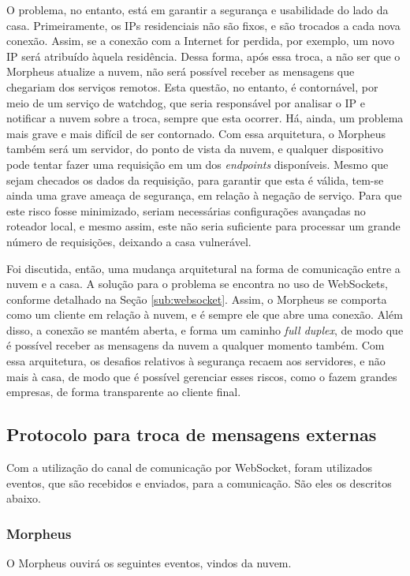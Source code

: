 O problema, no entanto, está em garantir a segurança e usabilidade do lado da casa. Primeiramente, os IPs residenciais não são fixos, e são trocados a cada nova conexão. Assim, se a conexão com a Internet for perdida, por exemplo, um novo IP será atribuído àquela residência. Dessa forma, após essa troca, a não ser que o Morpheus atualize a nuvem, não será possível receber as mensagens que chegariam dos serviços remotos. Esta questão, no entanto, é contornável, por meio de um serviço de watchdog, que seria responsável por analisar o IP e notificar a nuvem sobre a troca, sempre que esta ocorrer. Há, ainda, um problema mais grave e mais difícil de ser contornado. Com essa arquitetura, o Morpheus também será um servidor, do ponto de vista da nuvem, e qualquer dispositivo pode tentar fazer uma requisição em um dos \emph{endpoints} disponíveis. Mesmo que sejam checados os dados da requisição, para garantir que esta é válida, tem-se ainda uma grave ameaça de segurança, em relação à negação de serviço. Para que este risco fosse minimizado, seriam necessárias configurações avançadas no roteador local, e mesmo assim, este não seria suficiente para processar um grande número de requisições, deixando a casa vulnerável.

Foi discutida, então, uma mudança arquitetural na forma de comunicação entre a nuvem e a casa. A solução para o problema se encontra no uso de WebSockets, conforme detalhado na Seção \ref{sub:websocket}. Assim, o Morpheus se comporta como um cliente em relação à nuvem, e é sempre ele que abre uma conexão. Além disso, a conexão se mantém aberta, e forma um caminho \emph{full duplex}, de modo que é possível receber as mensagens da nuvem a qualquer momento também. Com essa arquitetura, os desafios relativos à segurança recaem aos servidores, e não mais à casa, de modo que é possível gerenciar esses riscos, como o fazem grandes empresas, de forma transparente ao cliente final.

\subsection{Protocolo para troca de mensagens externas}
Com a utilização do canal de comunicação por WebSocket, foram utilizados eventos, que são recebidos e enviados, para a comunicação. São eles os descritos abaixo.

\subsubsection{Morpheus}
O Morpheus ouvirá os seguintes eventos, vindos da nuvem.

